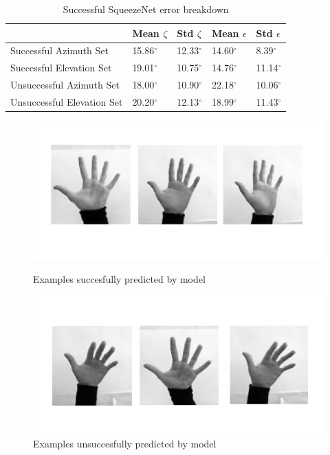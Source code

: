 \documentclass{article}
\begin{document}
\begin{table}[h!]
  \begin{center}
    \caption{Successful SqueezeNet error breakdown}
    \label{tab:tablebreakdown}
    \begin{tabular}{l|l|l|l|l}
      \textbf{} & \textbf{Mean $\zeta$} &  \textbf{Std $\zeta$} & \textbf{Mean $\epsilon$} &  \textbf{Std $\epsilon$}  \\
      \hline
      Successful Azimuth Set & 15.86$^{\circ}$ & 12.33$^{\circ}$& 14.60$^{\circ}$ & 8.39$^{\circ}$ \\
      Successful Elevation Set & 19.01$^{\circ}$  & 10.75$^{\circ}$ & 14.76$^{\circ}$ & 11.14$^{\circ}$\\
      Unsuccessful Azimuth Set & 18.00$^{\circ}$ & 10.90$^{\circ}$ & 22.18$^{\circ}$ & 10.06$^{\circ}$\\
      Unsuccessful Elevation Set & 20.20$^{\circ}$  & 12.13$^{\circ}$& 18.99$^{\circ}$ & 11.43$^{\circ}$\\
    \end{tabular}
  \end{center}
\end{table}

\begin{figure}[h]
 \hspace*{0cm}
  \includegraphics[scale=0.6]{goodz.pdf}
   \vspace*{-21mm}
  \caption{Examples succesfully predicted by model}
  \label{fig:goodz}

\hspace*{0cm}
  \includegraphics[scale=0.6]{badz.pdf}
  \vspace*{-18mm}
  \caption{Examples unsuccesfully predicted by model}
  \label{fig:badz}

\end{figure}
\end{document}
